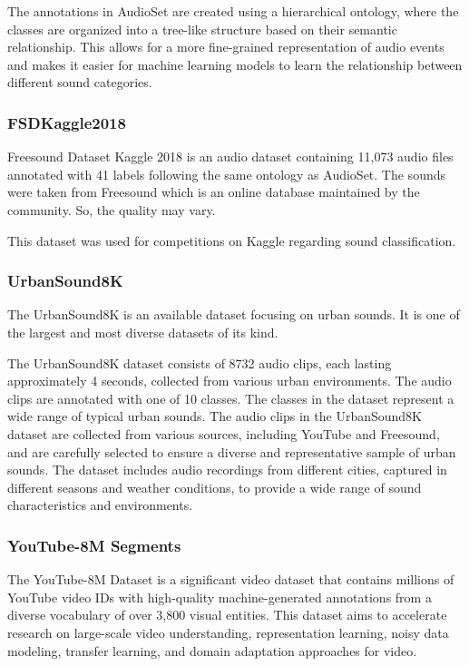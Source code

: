 The annotations in AudioSet are created using a hierarchical ontology, where the classes are organized into a tree-like structure based on their semantic relationship. This allows for a more fine-grained representation of audio events and makes it easier for machine learning models to learn the relationship between different sound categories.

\subsubsection{FSDKaggle2018}

Freesound Dataset Kaggle 2018 \cite{fonseca_general-purpose_2018} is an audio dataset containing 11,073 audio files annotated with 41 labels following the same ontology as AudioSet. The sounds were taken from Freesound which is an online database maintained by the community. So, the quality may vary.

This dataset was used for competitions on Kaggle regarding sound classification.

\subsubsection{UrbanSound8K}

The UrbanSound8K \cite{salamon_dataset_2014} is an available dataset focusing on urban sounds. It is one of the largest and most diverse datasets of its kind.

The UrbanSound8K dataset consists of 8732 audio clips, each lasting approximately 4 seconds, collected from various urban environments. The audio clips are annotated with one of 10 classes. The classes in the dataset represent a wide range of typical urban sounds.
The audio clips in the UrbanSound8K dataset are collected from various sources, including YouTube and Freesound, and are carefully selected to ensure a diverse and representative sample of urban sounds. The dataset includes audio recordings from different cities, captured in different seasons and weather conditions, to provide a wide range of sound characteristics and environments.

\subsubsection{YouTube-8M Segments}

The YouTube-8M Dataset is a significant video dataset \cite{abu-el-haija_youtube-8m_2016} that contains millions of YouTube video IDs with high-quality machine-generated annotations from a diverse vocabulary of over 3,800 visual entities. This dataset aims to accelerate research on large-scale video understanding, representation learning, noisy data modeling, transfer learning, and domain adaptation approaches for video.

